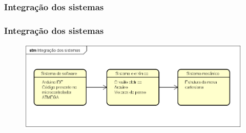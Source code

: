 \subsubsection{Integração dos sistemas}

\begin{frame}
\frametitle{Integração dos sistemas}

\begin{figure}
\centering
\includegraphics[scale = 0.4]{figs/integracao}
\end{figure}

\end{frame}
